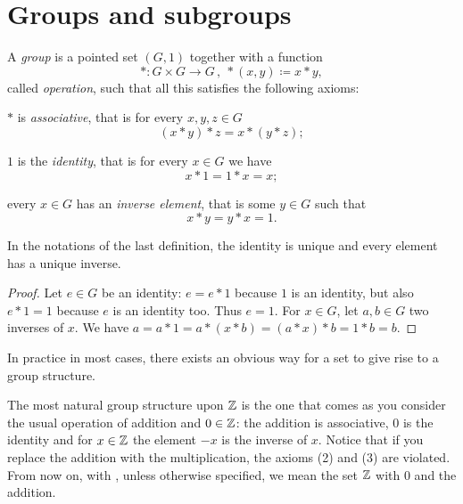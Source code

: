 
\section{Groups and subgroups}

\begin{definition}[Groups]
A {\em group} is a pointed set \((G, 1)\) together with a function
\[\ast : G \times G \to G \,, \ \ast(x, y) \coloneq x \ast y ,\]
called {\em operation}, such that all this satisfies the following axioms:
\begin{tcbenum}
\item \(\ast\) is {\em associative}, that is for every \(x,y,z \in G\)
\[(x \ast y) \ast z = x \ast (y \ast z) ;\]
\item \(1\) is the {\em identity}, that is for every \(x \in G\) we have
\[x \ast 1 = 1 \ast x = x ;\]
\item every \(x \in G\) has an {\em inverse element}, that is some \(y \in G\) such that
\[x \ast y = y \ast x = 1 .\]
\end{tcbenum}
\end{definition}

\begin{proposition}
In the notations of the last definition, the identity is unique and every element has a unique inverse.
\end{proposition}

\begin{proof}
Let \(e \in G\) be an identity: \(e = e \ast 1\) because \(1\) is an identity, but also \(e \ast 1 = 1\) because \(e\) is an identity too. Thus \(e = 1\). For \(x \in G\), let \(a, b \in G\) two inverses of \(x\). We have \(a = a \ast 1 = a \ast (x \ast b) = (a \ast x) \ast b = 1 \ast b = b\).
\end{proof}


In practice in most cases, there exists an obvious way for a set to give rise to a group structure.

\begin{example}
The most natural group structure upon \(\mathbb Z\) is the one that comes as you consider the usual operation of addition and \(0 \in \mathbb Z\): the addition is associative, \(0\) is the identity and for \(x \in \mathbb Z\) the element \(-x\) is the inverse of \(x\). Notice that if you replace the addition with the multiplication, the axioms (2) and (3) are violated. From now on, with , unless otherwise specified, we mean the set \(\mathbb Z\) with \(0\) and the addition.
\end{example}

